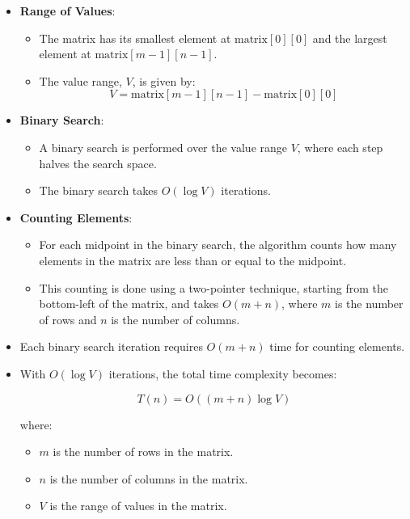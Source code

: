 \documentclass[a4paper,12pt]{report}
\begin{document}
\begin{itemize}
    \item \textbf{Range of Values}:
    \begin{itemize}
        \item The matrix has its smallest element at $\text{matrix}[0][0]$ and the largest element at $\text{matrix}[m-1][n-1]$.
        \item The value range, $V$, is given by:
        \[
        V = \text{matrix}[m-1][n-1] - \text{matrix}[0][0]
        \]
    \end{itemize}
    
    \item \textbf{Binary Search}:
    \begin{itemize}
        \item A binary search is performed over the value range $V$, where each step halves the search space.
        \item The binary search takes $O(\log V)$ iterations.
    \end{itemize}
    
    \item \textbf{Counting Elements}:
    \begin{itemize}
        \item For each midpoint in the binary search, the algorithm counts how many elements in the matrix are less than or equal to the midpoint.
        \item This counting is done using a two-pointer technique, starting from the bottom-left of the matrix, and takes $O(m + n)$, where $m$ is the number of rows and $n$ is the number of columns.
    \end{itemize}
\end{itemize}


\begin{itemize}
    \item Each binary search iteration requires $O(m + n)$ time for counting elements.
    \item With $O(\log V)$ iterations, the total time complexity becomes:
\begin{tcolorbox}[colback=white, colframe=black, boxrule=0.5pt] %
    \[
    T(n) = O((m + n) \log V)
    \]
\end{tcolorbox}
    where:
    \begin{itemize}
        \item $m$ is the number of rows in the matrix.
        \item $n$ is the number of columns in the matrix.
        \item $V$ is the range of values in the matrix.
    \end{itemize}
\end{itemize}
\end{document}
